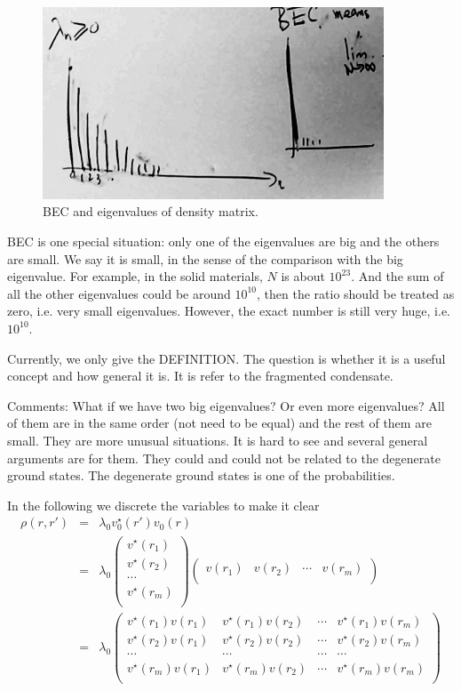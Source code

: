 \begin{figure}[htbp]
\centering
\includegraphics[width=4in]{image/1-4-bec.pdf} 
\caption{BEC and eigenvalues of density matrix.}
\label{fig:1-4}
\end{figure}

BEC is one special situation: only one of the eigenvalues are big and the others are small. We say it is small, in the sense of the comparison with the big eigenvalue. For example, in the solid materials, $N$ is about $10^{23}$. And the sum of all the other eigenvalues could be around $10^10$, then the ratio should be treated as zero, i.e. very small eigenvalues. However, the exact number is still very huge, i.e. $10^{10}$. 

Currently, we only give the DEFINITION. The question is whether it is a useful concept and how general it is. It is refer to the fragmented condensate. 

Comments: What if we have two big eigenvalues? Or even more eigenvalues? All of them are in the same order (not need to be equal) and the rest of them are small. They are more unusual situations. It is hard to see and several general arguments are for them. They could and could not be related to the degenerate ground states. The degenerate ground states is one of the probabilities.

In the following we discrete the variables to make it clear 
\begin{eqnarray}
\rho(r,r') &=& \lambda_0 v_0^\star(r')v_0(r) \\
&=& \lambda_0 \left(\begin{array}{c}
v^\star(r_1)\\
v^\star(r_2)\\
\cdots\\
v^\star(r_m)\\
\end{array}\right) 
\left(\begin{array}{cccc} v(r_1)& v(r_2)&\cdots & v(r_m)\\ \end{array}\right)\\
&=& \lambda_0 
\left(\begin{array}{cccc}
v^\star(r_1)v(r_1)& v^\star(r_1)v(r_2)&\cdots & v^\star(r_1)v(r_m)\\
v^\star(r_2)v(r_1)& v^\star(r_2)v(r_2)&\cdots & v^\star(r_2)v(r_m)\\
\cdots& \cdots&\cdots & \cdots\\
v^\star(r_m)v(r_1)& v^\star(r_m)v(r_2)&\cdots & v^\star(r_m)v(r_m)\\
\end{array}\right)
\end{eqnarray}

